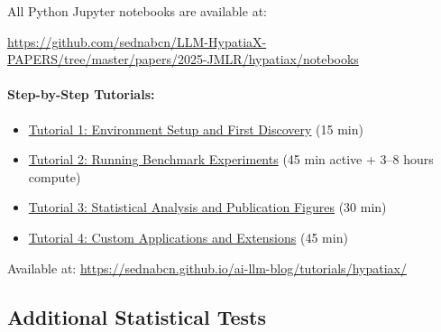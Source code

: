 \documentclass[twoside,11pt]{article}
\begin{document}
All Python Jupyter notebooks are available at:
\begin{center}
{\footnotesize\url{https://github.com/sednabcn/LLM-HypatiaX-PAPERS/tree/master/papers/2025-JMLR/hypatiax/notebooks}}
\end{center}


\paragraph{Step-by-Step Tutorials:}
\begin{itemize}
\item \href{https://sednabcn.github.io/ai-llm-blog/tutorials/hypatiax/setup/}{Tutorial 1: Environment Setup and First Discovery} (15 min)
\item \href{https://sednabcn.github.io/ai-llm-blog/tutorials/hypatiax/experiments/}{Tutorial 2: Running Benchmark Experiments} (45 min active + 3--8 hours compute)
\item \href{https://sednabcn.github.io/ai-llm-blog/tutorials/hypatiax/analysis/}{Tutorial 3: Statistical Analysis and Publication Figures} (30 min)
\item \href{https://sednabcn.github.io/ai-llm-blog/tutorials/hypatiax/extensions/}{Tutorial 4: Custom Applications and Extensions} (45 min)
\end{itemize}
Available at: \url{https://sednabcn.github.io/ai-llm-blog/tutorials/hypatiax/}


\subsection{Additional Statistical Tests}
\end{document}
